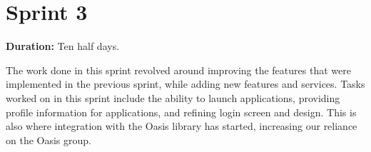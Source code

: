 \section{Sprint 3}%

\textbf{Duration:} Ten half days. \newline

The work done in this sprint revolved around improving the features that were implemented in the previous sprint, while adding new features and services. 
Tasks worked on in this sprint include the ability to launch applications, providing profile information for applications, and refining login screen and design. 
This is also where integration with the Oasis library has started, increasing our reliance on the Oasis group. 